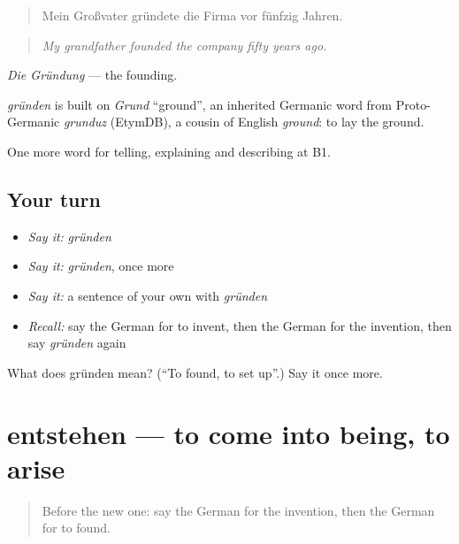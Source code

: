 \begin{quote}
Mein Großvater gründete die Firma vor fünfzig Jahren.
\end{quote}

\begin{quote}
\emph{My grandfather founded the company fifty years ago.}
\end{quote}

\emph{Die Gründung} — the founding.

\begin{cousinweb}
\emph{gründen} is built on \emph{Grund} \textquotedblleft{}ground\textquotedblright{}, an inherited Germanic word from Proto-Germanic \emph{grunduz} (EtymDB), a cousin of English \emph{ground}: to lay the ground.
\end{cousinweb}

\begin{grammarlens}[title={What you've built}]
One more word for telling, explaining and describing at B1.
\end{grammarlens}

\subsection*{Your turn}
\begin{itemize}
\raggedright
  \item \emph{Say it:} \emph{gründen}
  \item \emph{Say it:} \emph{gründen}, once more
  \item \emph{Say it:} a sentence of your own with \emph{gründen}
  \item \emph{Recall:} say the German for to invent, then the German for the invention, then say \emph{gründen} again
\end{itemize}

\begin{tcolorbox}[breakable,colback=teal!4,colframe=teal!35!black,title={Before you move on}]
What does gründen mean? (\textquotedblleft{}To found, to set up\textquotedblright{}.) Say it once more.
\end{tcolorbox}
\section[entstehen]{entstehen — to come into being, to arise}

\label{lesson:GE-C321-entstehen}



\begin{quote}
Before the new one: say the German for the invention, then the German for to found.
\end{quote}

